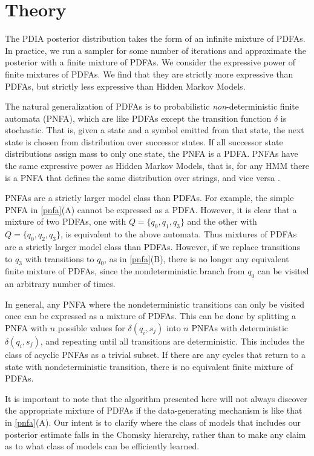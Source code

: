 \section{Theory}
\label{theory}

The PDIA posterior distribution takes the form of an infinite mixture of PDFAs.  In practice, we run a sampler for some number of iterations and approximate the posterior with a finite mixture of PDFAs.  We consider the expressive power of finite mixtures of PDFAs.  We find that they are strictly more expressive than PDFAs, but strictly less expressive than Hidden Markov Models.

The natural generalization of PDFAs is to probabilistic {\em non}-deterministic finite automata (PNFA), which are like PDFAs except the transition function $\delta$ is stochastic.  That is, given a state and a symbol emitted from that state, the next state is chosen from distribution over successor states.  If all successor state distributions assign mass to only one state, the PNFA is a PDFA.  PNFAs have the same expressive power as Hidden Markov Models, that is, for any HMM there is a PNFA that defines the same distribution over strings, and vice versa \cite{Dupont2005}.

PNFAs are a strictly larger model class than PDFAs.  For example, the simple PNFA in \ref{pnfa}(A) cannot be expressed as a PDFA.  However, it is clear that a mixture of two PDFAs, one with $Q = \{q_0,q_1,q_3\}$ and the other with $Q = \{q_0,q_2,q_3\}$, is equivalent to the above automata.  Thus mixtures of PDFAs are a strictly larger model class than PDFAs.  However, if we replace transitions to $q_3$ with transitions to $q_0$, as in \ref{pnfa}(B), there is no longer any equivalent finite mixture of PDFAs, since the nondeterministic branch from $q_0$ can be visited an arbitrary number of times.  

In general, any PNFA where the nondeterministic transitions can only be visited once can be expressed as a mixture of PDFAs.  This can be done by splitting a PNFA with $n$ possible values for $\delta(q_i,s_j)$ into $n$ PNFAs with deterministic $\delta(q_i,s_j)$, and repeating until all transitions are deterministic.  This includes the class of acyclic PNFAs as a trivial subset.  If there are any cycles that return to a state with nondeterministic transition, there is no equivalent finite mixture of PDFAs.

It is important to note that the algorithm presented here will not always discover the appropriate mixture of PDFAs if the data-generating mechanism is like that in \ref{pnfa}(A).  Our intent is to clarify where the class of models that includes our posterior estimate falls in the Chomsky hierarchy, rather than to make any claim as to what class of models can be efficiently learned.

